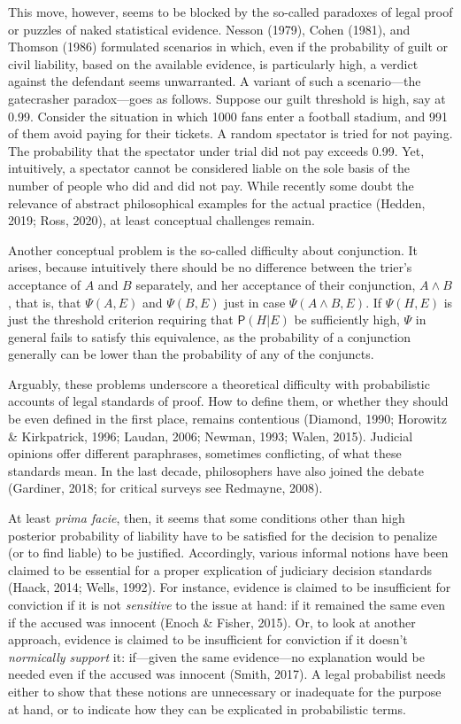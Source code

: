 \documentclass[11pt,dvipsnames,enabledeprecatedfontcommands]{scrartcl}
\newcommand{\pr}[1]{\mathsf{P}(#1)}
\begin{document}
This move, however, seems to be blocked by the so-called paradoxes of
legal proof or puzzles of naked statistical evidence. Nesson (1979),
Cohen (1981), and Thomson (1986) formulated scenarios in which, even if
the probability of guilt or civil liability, based on the available
evidence, is particularly high, a verdict against the defendant seems
unwarranted. A variant of such a scenario---the gatecrasher
paradox---goes as follows. Suppose our guilt threshold is high, say at
0.99. Consider the situation in which 1000 fans enter a football
stadium, and 991 of them avoid paying for their tickets. A random
spectator is tried for not paying. The probability that the spectator
under trial did not pay exceeds 0.99. Yet, intuitively, a spectator
cannot be considered liable on the sole basis of the number of people
who did and did not pay. While recently some doubt the relevance of
abstract philosophical examples for the actual practice (Hedden, 2019;
Ross, 2020), at least conceptual challenges remain.

Another conceptual problem is the so-called difficulty about
conjunction. It arises, because intuitively there should be no
difference between the trier's acceptance of \(A\) and \(B\) separately,
and her acceptance of their conjunction, \(A\wedge B\), that is, that
\(\Psi(A,E)\) and \(\Psi(B,E)\) just in case \(\Psi(A\wedge B, E)\). If
\(\Psi(H,E)\) is just the threshold criterion requiring that
\(\pr{H\vert E}\) be sufficiently high, \(\Psi\) in general fails to
satisfy this equivalence, as the probability of a conjunction generally
can be lower than the probability of any of the conjuncts.

Arguably, these problems underscore a theoretical difficulty with
probabilistic accounts of legal standards of proof. How to define them,
or whether they should be even defined in the first place, remains
contentious (Diamond, 1990; Horowitz \& Kirkpatrick, 1996; Laudan, 2006;
Newman, 1993; Walen, 2015). Judicial opinions offer different
paraphrases, sometimes conflicting, of what these standards mean. In the
last decade, philosophers have also joined the debate (Gardiner, 2018;
for critical surveys see Redmayne, 2008).

At least \emph{prima facie}, then, it seems that some conditions other
than high posterior probability of liability have to be satisfied for
the decision to penalize (or to find liable) to be justified.
Accordingly, various informal notions have been claimed to be essential
for a proper explication of judiciary decision standards (Haack, 2014;
Wells, 1992). For instance, evidence is claimed to be insufficient for
conviction if it is not \emph{sensitive} to the issue at hand: if it
remained the same even if the accused was innocent (Enoch \& Fisher,
2015). Or, to look at another approach, evidence is claimed to be
insufficient for conviction if it doesn't \emph{normically support} it:
if---given the same evidence---no explanation would be needed even if
the accused was innocent (Smith, 2017). A legal probabilist needs either
to show that these notions are unnecessary or inadequate for the purpose
at hand, or to indicate how they can be explicated in probabilistic
terms.
\end{document}
